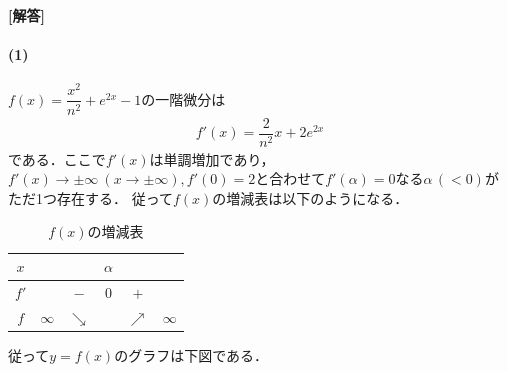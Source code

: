 \documentclass[../../main.tex]{subfiles}
\begin{document}
\begin{oframed}
  
\end{oframed}

{\bf [解答]}

\paragraph{(1)}

$f(x)=\dfrac{x^2}{n^2}+e^{2x}-1$の一階微分は
\begin{align}
  f'(x)=\dfrac{2}{n^2}x+2e^{2x} \label{eq:1}
\end{align}
である．ここで$f'(x)$は単調増加であり，$f'(x)\to\pm\infty\ (x\to\pm\infty), f'(0)=2$と合わせて$f'(\alpha)=0$なる$\alpha\, (<0)$がただ1つ存在する．
従って$f(x)$の増減表は以下のようになる．

\begin{table}[htb]
  \centering
  \caption{$f(x)$の増減表}
  \begin{tabular}{c|ccccc}
    $x$ & & & $\alpha$ & & \\
    \hline
    $f'$ & & $-$ & $0$ & $+$ & \\
    \hline
    $f$ & $\infty$ & $\searrow$ & & $\nearrow$ & $\infty$
  \end{tabular}
\end{table}

従って$y=f(x)$のグラフは下図である．
\end{document}
